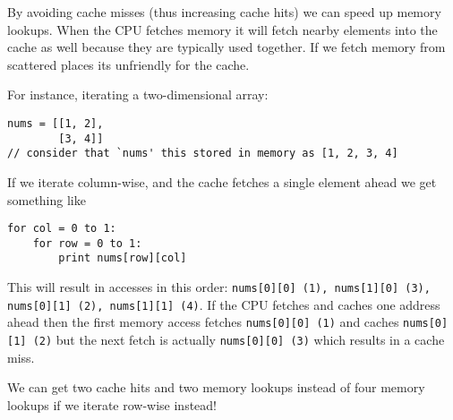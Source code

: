 
By avoiding cache misses (thus increasing cache hits) we can speed up memory lookups. When the CPU fetches memory it will fetch nearby elements into the cache as well because they are typically used together. If we fetch memory from scattered places its unfriendly for the cache.

For instance, iterating a two-dimensional array:

\begin{lstlisting}
nums = [[1, 2],
        [3, 4]]
// consider that `nums' this stored in memory as [1, 2, 3, 4]
\end{lstlisting}

If we iterate column-wise, and the cache fetches a single element ahead we get something like

\begin{lstlisting}
for col = 0 to 1:
    for row = 0 to 1:
        print nums[row][col]
\end{lstlisting}

This will result in accesses in this order: \texttt{nums[0][0] (1), nums[1][0] (3), nums[0][1] (2), nums[1][1] (4)}. If the CPU fetches and caches one address ahead then the first memory access fetches \texttt{nums[0][0] (1)} and caches \texttt{nums[0][1] (2)} but the next fetch is actually \texttt{nums[0][0] (3)} which results in a cache miss.

We can get two cache hits and two memory lookups instead of four memory lookups if we iterate row-wise instead!
